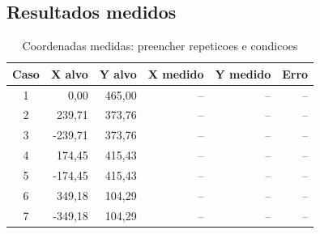 \subsection{Resultados medidos}
\begin{table}[H]\centering
\caption{Coordenadas medidas: preencher repeticoes e condicoes}
\begin{tabular}{crrrrr}\toprule
Caso & X alvo & Y alvo & X medido & Y medido & Erro\\\midrule
1&0,00&465,00&--&--&--\\
2&239,71&373,76&--&--&--\\
3&-239,71&373,76&--&--&--\\
4&174,45&415,43&--&--&--\\
5&-174,45&415,43&--&--&--\\
6&349,18&104,29&--&--&--\\
7&-349,18&104,29&--&--&--\\
\bottomrule\end{tabular}\end{table}
